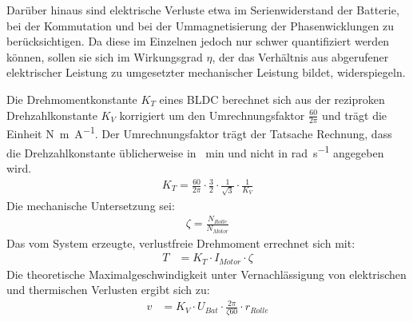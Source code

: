 	Darüber hinaus sind elektrische Verluste etwa im Serienwiderstand der Batterie, bei der Kommutation und bei der Ummagnetisierung der Phasenwicklungen zu berücksichtigen.
	Da diese im Einzelnen jedoch nur schwer quantifiziert werden können, sollen sie sich im Wirkungsgrad \(\eta\), der das Verhältnis aus abgerufener elektrischer Leistung zu umgesetzter mechanischer Leistung bildet, widerspiegeln.\par\medskip
	Die Drehmomentkonstante \(K_T\) eines BLDC berechnet sich aus der reziproken Drehzahlkonstante \(K_V\) korrigiert um den Umrechnungsfaktor \(\frac{60}{2\pi}\) und trägt die Einheit \unit{\newton\metre\per\ampere}.
	Der Umrechnungsfaktor trägt der Tatsache Rechnung, dass die Drehzahlkonstante üblicherweise in \unit{\per\minute} und nicht in \unit{\radian\per\second} angegeben wird\cite{DalY.Ohm.2000}.
	\begin{align}
		K_T = \frac{60}{2\pi} \cdot \frac{3}{2} \cdot \frac{1}{\sqrt{3}} \cdot \frac{1}{K_V}
		\label{eq:kv to kt}
	\end{align}
	Die mechanische Untersetzung sei:
	\begin{align}
		\zeta = \frac{N_{Rolle}}{N_{Motor}}
		\label{eq:reduction}
	\end{align}
	Das vom System erzeugte, verlustfreie Drehmoment errechnet sich mit:
	\begin{align}
		T	&= K_T \cdot I_{Motor} \cdot \zeta
		\label{eq:frictionless acceleration}
	\end{align}
	Die theoretische Maximalgeschwindigkeit unter Vernachlässigung von elektrischen und thermischen Verlusten ergibt sich zu:
	\begin{align}
		v	&= K_V \cdot U_{Bat} \cdot \frac{2\pi}{\zeta 60} \cdot r_{Rolle}
		\label{eq:kv rating}
	\end{align}
	\nocite{Meschede.2015}\nocite{Demtroder.2018}